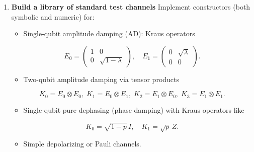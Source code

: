 \documentclass[11pt]{article}
\begin{document}
\begin{enumerate}
\begin{equation}
\text{diag}(\rho_k) \quad\text{vs}\quad P^k \, e_i,
\end{equation}

       where $e_i$ is the $i$-th standard basis vector.  
\begin{itemize}
\item Use this to quantify how ``classical'' the channel looks in a given basis.
\end{itemize}

\item \textbf{Build a library of standard test channels}  
   Implement constructors (both symbolic and numeric) for:

\begin{itemize}
\item Single-qubit amplitude damping (AD): Kraus operators
\end{itemize}
     
\begin{equation}
E_0 = \begin{pmatrix} 1 & 0 \\ 0 & \sqrt{1-\lambda} \end{pmatrix},\quad
     E_1 = \begin{pmatrix} 0 & \sqrt{\lambda} \\ 0 & 0 \end{pmatrix}.
\end{equation}

\begin{itemize}
\item Two-qubit amplitude damping via tensor products
\end{itemize}
     
\begin{equation}
K_0 = E_0\otimes E_0,\;
     K_1 = E_0\otimes E_1,\;
     K_2 = E_1\otimes E_0,\;
     K_3 = E_1\otimes E_1.
\end{equation}

\begin{itemize}
\item Single-qubit pure dephasing (phase damping) with Kraus operators like
\end{itemize}
     
\begin{equation}
K_0 = \sqrt{1-p}\,I,\quad K_1 = \sqrt{p}\,Z.
\end{equation}

\begin{itemize}
\item Simple depolarizing or Pauli channels.
\end{itemize}


\end{enumerate}
\end{document}
